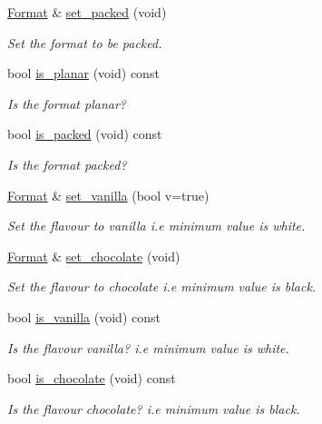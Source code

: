 \begin{DoxyCompactItemize}
\hyperlink{class_c_m_s_1_1_format}{Format} \& \hyperlink{class_c_m_s_1_1_format_ac084e9e34867955fe2d72d28f88a13fd}{set\+\_\+packed} (void)
\begin{DoxyCompactList}\small\item\em Set the format to be packed. \end{DoxyCompactList}\item 
bool \hyperlink{class_c_m_s_1_1_format_a5a68cabcf9383bdf6a7e2a301f1f9312}{is\+\_\+planar} (void) const
\begin{DoxyCompactList}\small\item\em Is the format planar? \end{DoxyCompactList}\item 
bool \hyperlink{class_c_m_s_1_1_format_a6db3cf6bd48d72134e2bfaa6c9c73138}{is\+\_\+packed} (void) const
\begin{DoxyCompactList}\small\item\em Is the format packed? \end{DoxyCompactList}\item 
\hyperlink{class_c_m_s_1_1_format}{Format} \& \hyperlink{class_c_m_s_1_1_format_ae70a145a08b762c1d15cffe4eb09444b}{set\+\_\+vanilla} (bool v=true)
\begin{DoxyCompactList}\small\item\em Set the flavour to \textquotesingle{}vanilla\textquotesingle{} i.\+e minimum value is white. \end{DoxyCompactList}\item 
\hyperlink{class_c_m_s_1_1_format}{Format} \& \hyperlink{class_c_m_s_1_1_format_aae8f3fe22d8a9c70c4f5e69137b7331f}{set\+\_\+chocolate} (void)
\begin{DoxyCompactList}\small\item\em Set the flavour to \textquotesingle{}chocolate\textquotesingle{} i.\+e minimum value is black. \end{DoxyCompactList}\item 
bool \hyperlink{class_c_m_s_1_1_format_a86988f817294b0efdcd7efd76f57e87a}{is\+\_\+vanilla} (void) const
\begin{DoxyCompactList}\small\item\em Is the flavour \textquotesingle{}vanilla\textquotesingle{}? i.\+e minimum value is white. \end{DoxyCompactList}\item 
bool \hyperlink{class_c_m_s_1_1_format_a3f4c0306ed08352ae89df359427be794}{is\+\_\+chocolate} (void) const
\begin{DoxyCompactList}\small\item\em Is the flavour \textquotesingle{}chocolate\textquotesingle{}? i.\+e minimum value is black. \end{DoxyCompactList}\item 

\end{DoxyCompactItemize}
